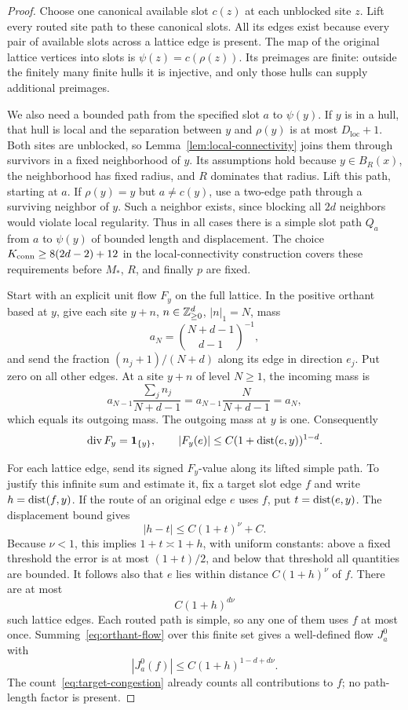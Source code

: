 \begin{proof}
Choose one canonical available slot $c(z)$ at each unblocked site $z$.
Lift every routed site path to these canonical slots.  All its edges exist
because every pair of available slots across a lattice edge is present.
The map of the original lattice vertices into slots is
$\psi(z)=c(\rho(z))$.  Its preimages are finite: outside the finitely many
finite hulls it is injective, and only those hulls can supply additional
preimages.

We also need a bounded path from the specified slot $a$ to $\psi(y)$.
If $y$ is in a hull, that hull is local and the separation between $y$
and $\rho(y)$ is at most $D_{\mathrm{loc}}+1$.  Both sites are unblocked, so
Lemma~\ref{lem:local-connectivity} joins them through survivors in a
fixed neighborhood of $y$.  Its assumptions hold because $y\in B_R(x)$,
the neighborhood has fixed radius, and $R$ dominates that radius.
Lift this path, starting at $a$.  If $\rho(y)=y$ but $a\ne c(y)$,
use a two-edge path through a surviving neighbor of $y$.  Such a neighbor
exists, since blocking all $2d$ neighbors would violate local regularity.
Thus in all cases there is a simple slot path $Q_a$ from $a$ to $\psi(y)$
of bounded length and displacement.  The choice
$K_{\rm conn}\ge8(2d-2)+12$ in the local-connectivity construction covers
these requirements before $M_*$, $R$, and finally $p$ are fixed.

Start with an explicit unit flow $F_y$ on the full lattice.  In the
positive orthant based at $y$, give each site $y+n$, $n\in\mathbb Z_{\ge0}^d$,
$|n|_1=N$, mass
\[
 a_N=\binom{N+d-1}{d-1}^{-1},
\]
and send the fraction $(n_j+1)/(N+d)$ along its edge in direction $e_j$.
Put zero on all other edges.  At a site $y+n$ of level $N\ge1$, the
incoming mass is
\[
 a_{N-1}\frac{\sum_j n_j}{N+d-1}
 =a_{N-1}\frac{N}{N+d-1}=a_N,
\]
which equals its outgoing mass.  The outgoing mass at $y$ is one.
Consequently
\begin{equation}\label{eq:orthant-flow}
 \operatorname{div}F_y=\mathbf 1_{\{y\}},\qquad
 |F_y(e)|\le C(1+\operatorname{dist}(e,y))^{1-d}.
\end{equation}

For each lattice edge, send its signed $F_y$-value along its lifted simple
path.  To justify this infinite sum and estimate it, fix a target slot
edge $f$ and write $h=\operatorname{dist}(f,y)$.  If the route of an original edge $e$
uses $f$, put $t=\operatorname{dist}(e,y)$.  The displacement bound gives
\[
 |h-t|\le C(1+t)^\nu+C.
\]
Because $\nu<1$, this implies $1+t\asymp1+h$, with uniform constants:
above a fixed threshold the error is at most $(1+t)/2$, and below that
threshold all quantities are bounded.  It follows also that $e$ lies
within distance $C(1+h)^\nu$ of $f$.  There are at most
\begin{equation}\label{eq:target-congestion}
 C(1+h)^{d\nu}
\end{equation}
such lattice edges.  Each routed path is simple, so any one of them uses
$f$ at most once.  Summing~\eqref{eq:orthant-flow} over this finite set
gives a well-defined flow $J_a^0$ with
\[
 |J_a^0(f)|\le C(1+h)^{1-d+d\nu}.
\]
The count~\eqref{eq:target-congestion} already counts all contributions
to $f$; no path-length factor is present.


\end{proof}
